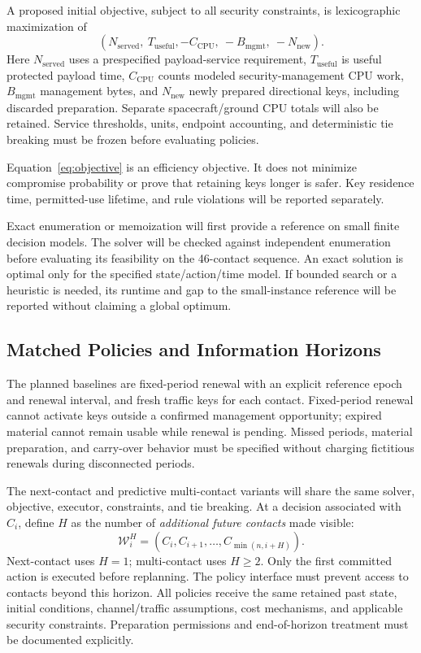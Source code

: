 \documentclass[conference]{IEEEtran}
\begin{document}
A proposed initial objective, subject to all security constraints, is lexicographic maximization of
\begin{equation}
\left(N_{\mathrm{served}},\ T_{\mathrm{useful}},
-C_{\mathrm{CPU}},\ -B_{\mathrm{mgmt}},\ -N_{\mathrm{new}}\right).
\label{eq:objective}
\end{equation}
Here $N_{\mathrm{served}}$ uses a prespecified payload-service requirement, $T_{\mathrm{useful}}$ is useful protected payload time, $C_{\mathrm{CPU}}$ counts modeled security-management CPU work, $B_{\mathrm{mgmt}}$ management bytes, and $N_{\mathrm{new}}$ newly prepared directional keys, including discarded preparation. Separate spacecraft/ground CPU totals will also be retained. Service thresholds, units, endpoint accounting, and deterministic tie breaking must be frozen before evaluating policies.

Equation~\eqref{eq:objective} is an efficiency objective. It does not minimize compromise probability or prove that retaining keys longer is safer. Key residence time, permitted-use lifetime, and rule violations will be reported separately.

Exact enumeration or memoization will first provide a reference on small finite decision models. The solver will be checked against independent enumeration before evaluating its feasibility on the 46-contact sequence. An exact solution is optimal only for the specified state/action/time model. If bounded search or a heuristic is needed, its runtime and gap to the small-instance reference will be reported without claiming a global optimum.

\subsection{Matched Policies and Information Horizons}
The planned baselines are fixed-period renewal with an explicit reference epoch and renewal interval, and fresh traffic keys for each contact. Fixed-period renewal cannot activate keys outside a confirmed management opportunity; expired material cannot remain usable while renewal is pending. Missed periods, material preparation, and carry-over behavior must be specified without charging fictitious renewals during disconnected periods.

The next-contact and predictive multi-contact variants will share the same solver, objective, executor, constraints, and tie breaking. At a decision associated with $C_i$, define $H$ as the number of \emph{additional future contacts} made visible:
\begin{equation}
\mathcal{W}_i^H =
(C_i,C_{i+1},\ldots,C_{\min(n,i+H)}).
\end{equation}
Next-contact uses $H=1$; multi-contact uses $H\geq2$. Only the first committed action is executed before replanning. The policy interface must prevent access to contacts beyond this horizon. All policies receive the same retained past state, initial conditions, channel/traffic assumptions, cost mechanisms, and applicable security constraints. Preparation permissions and end-of-horizon treatment must be documented explicitly.
\end{document}
